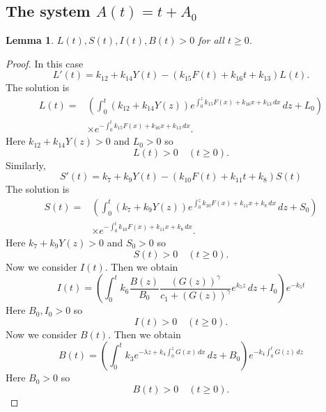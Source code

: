 \documentclass[pdflatex,sn-mathphys-num]{sn-jnl}
\theoremstyle{thmstyleone}
\newtheorem{lemma}{Lemma}[section]
\theoremstyle{thmstyletwo}
\theoremstyle{thmstylethree}
\begin{document}
\subsection{\texorpdfstring{The system $A(t)=t+A_0$}{The system A(t)=t+A0}}

\begin{lemma}
    $L(t), S(t), I(t), B(t)>0$ for all $t\geq 0$.
\end{lemma}
\begin{proof}
    In this case 
\begin{equation}
L'(t)=k_{12}+k_{14}Y(t)-(k_{15}F(t)+k_{16}t+k_{13})L(t).
\end{equation}
The solution is
\begin{align}
L(t) = & \left(\int_0^t \left( k_{12} + k_{14}Y(z) \right) 
e^{\int_0^z k_{15}F(x)+k_{16}x+k_{13} \, dx} \, dz +L_0 \right) \nonumber \\
   &\times e^{-\int_0^t k_{15}F(x)+k_{16}x+k_{13} \, dx}. \label{eq:L gen exp sol}
\end{align}
Here $k_{12}+k_{14}Y(z)>0$ and $L_0>0$ so 
\begin{equation}
    L(t)>0\quad (t\geq 0).
\end{equation}
Similarly, 
\begin{equation}
S'(t)=k_7+k_9 Y(t)-(k_{10}F(t)+k_{11}t+k_8)S(t)
\end{equation}
The solution is
\begin{align}
S(t) = & \left(\int_0^t \left( k_{7} + k_{9}Y(z) \right) 
e^{\int_0^z k_{10}F(x)+k_{11}x+k_{8} \, dx} \, dz +S_0 \right) \nonumber \\
   &\times e^{-\int_0^t k_{10}F(x)+k_{11}x+k_{8} \, dx}. \label{eq:S gen exp sol}
\end{align}
Here $k_{7}+k_{9}Y(z)>0$ and $S_0>0$ so 
\begin{equation}
    S(t)>0\quad (t\geq 0).
\end{equation}
Now we consider $I(t)$.
Then we obtain
\begin{equation}\label{eq:I gen exp sol}
I(t)=\left(
\int_0^t k_6\frac{B(z)}{B_0}
\frac{(G(z))^{\gamma}}{c_1+(G(z))^{\gamma}}e^{k_5z}\,dz+
I_0
\right)e^{-k_5t}
\end{equation}
Here $B_0,I_0>0$ so
\begin{equation}
   I(t)>0\quad (t\geq 0).
\end{equation}
Now we consider $B(t)$.
Then we obtain
\begin{equation}\label{eq:B gen exp sol}
B(t)=\left(
\int_0^t k_3 e^{-\lambda z +k_4 \int_0^z G(x)\,dx}
\,dz+
B_0
\right)e^{-k_4 \int_0^t G(z)\,dz}
\end{equation}
Here $B_0>0$ so  
\begin{equation}
   B(t)>0\quad (t\geq 0).
\end{equation}
\end{proof}
\end{document}
